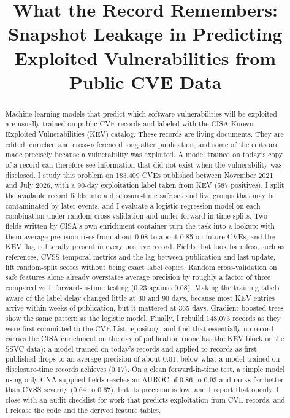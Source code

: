 \documentclass[conference,a4paper]{IEEEtran}
\title{What the Record Remembers: Snapshot Leakage in Predicting Exploited Vulnerabilities from Public CVE Data}
\author{\IEEEauthorblockN{Anonymous Submission}}
\author{\IEEEauthorblockN{Hilux Fokou Ngoumo}
\IEEEauthorblockA{Information Security Programme, ITMO University\\Saint Petersburg, Russia}}
\begin{document}
\maketitle

\begin{abstract}
Machine learning models that predict which software vulnerabilities will be exploited are usually trained on public CVE records and labeled with the CISA Known Exploited Vulnerabilities (KEV) catalog. These records are living documents. They are edited, enriched and cross-referenced long after publication, and some of the edits are made precisely because a vulnerability was exploited. A model trained on today's copy of a record can therefore see information that did not exist when the vulnerability was disclosed. I study this problem on 183,409 CVEs published between November 2021 and July 2026, with a 90-day exploitation label taken from KEV (587 positives). I split the available record fields into a disclosure-time safe set and five groups that may be contaminated by later events, and I evaluate a logistic regression model on each combination under random cross-validation and under forward-in-time splits. Two fields written by CISA's own enrichment container turn the task into a lookup: with them average precision rises from about 0.08 to about 0.85 on future CVEs, and the KEV flag is literally present in every positive record. Fields that look harmless, such as references, CVSS temporal metrics and the lag between publication and last update, lift random-split scores without being exact label copies. Random cross-validation on safe features alone already overstates average precision by roughly a factor of three compared with forward-in-time testing (0.23 against 0.08). Making the training labels aware of the label delay changed little at 30 and 90 days, because most KEV entries arrive within weeks of publication, but it mattered at 365 days. Gradient boosted trees show the same pattern as the logistic model. Finally, I rebuild 148,073 records as they were first committed to the CVE List repository, and find that essentially no record carries the CISA enrichment on the day of publication (none has the KEV block or the SSVC data): a model trained on today's records and applied to records as first published drops to an average precision of about 0.01, below what a model trained on disclosure-time records achieves (0.17). On a clean forward-in-time test, a simple model using only CNA-supplied fields reaches an AUROC of 0.86 to 0.93 and ranks far better than CVSS severity (0.64 to 0.67), but its precision is low, and I report that openly. I close with an audit checklist for work that predicts exploitation from CVE records, and I release the code and the derived feature tables.
\end{abstract}
\end{document}
